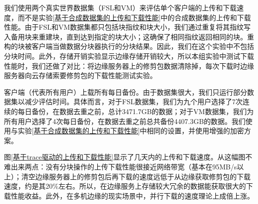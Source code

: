 \documentclass[promaster]{thesis-uestc}
\begin{document}
我们使用两个真实世界数据集（FSL和VM）来评估单个客户端的上传和下载速度，而不是实验\ref{基于合成数据集的上传和下载性能}中的合成数据集的上传和下载性能。由于FSL和VM数据集都只包括块指纹和块大小，我们通过重复将其指纹写入备用块来重建块，直到达到指定的块大小；这确保了相同指纹返回相同的块。重构的块被客户端当做数据分块器执行的分块结果。因此，我们在这个实验中不包括分块时间。此外，存储开销实验显示边缘存储开销较大，所以本组实验中测试下载性能时，我们还做了对比：将边缘服务器上的修剪包数据清除掉，每次下载时边缘服务器向云存储索要修剪包的下载性能测试实验。

客户端（代表所有用户）上载所有每日备份。由于数据集很大，我们只运行部分数据集以减少评估时间。具体而言，对于FSL数据集，我们为九个用户选择了7次连续的每日备份，在数据去重之前，总计3471.7GB的数据；对于VM数据集，我们为所有用户选择了4次每日备份，在数据去重之前总共备份4407.3GB的数据。我们使用与实验\ref{基于合成数据集的上传和下载性能}中相同的设置，并使用增强的加密方案。

图\ref{基于trace驱动的上传和下载性能}显示了几天内的上传和下载速度。从这幅图不难出来两点：没有分块操作的上传下载性能很接近网络带宽（基本在95MB/s以上）；清空边缘服务器上的修剪包后再下载的速度远低于从边缘获取修剪包的下载速度，约是其20\%左右。所以，在边缘服务上存储较大冗余的数据能获取很大的下载性能收益。此外，在多机边缘的现实场景中，并行下载的速度理论上成倍上涨。
\end{document}
